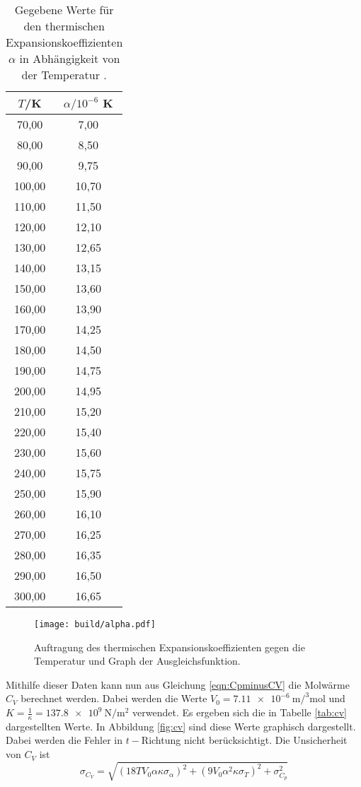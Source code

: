 \begin{table}[htp]
	\begin{center}
    \caption{Gegebene Werte für den thermischen Expansionskoeffizienten $\alpha$ in Abhängigkeit von der
    Temperatur \cite{versuchsanleitung}.}
    \label{tab:alpha}
		\begin{tabular}{cc}
		\toprule
			{$T$/K} & {$\alpha/10^{-6}$ K}\\
			\midrule
			70,00 & 7,00\\
			80,00 & 8,50\\
			90,00 & 9,75\\
			100,00 & 10,70\\
			110,00 & 11,50\\
			120,00 & 12,10\\
			130,00 & 12,65\\
			140,00 & 13,15\\
			150,00 & 13,60\\
			160,00 & 13,90\\
			170,00 & 14,25\\
			180,00 & 14,50\\
			190,00 & 14,75\\
			200,00 & 14,95\\
			210,00 & 15,20\\
			220,00 & 15,40\\
			230,00 & 15,60\\
			240,00 & 15,75\\
			250,00 & 15,90\\
			260,00 & 16,10\\
			270,00 & 16,25\\
			280,00 & 16,35\\
			290,00 & 16,50\\
			300,00 & 16,65\\
		\bottomrule
		\end{tabular}
	\end{center}
\end{table}

\begin{figure}
  \centering
  \texttt{[image: build/alpha.pdf]}
  \caption{Auftragung des thermischen Expansionskoeffizienten gegen die Temperatur und Graph der
  Ausgleichsfunktion.}
  \label{fig:alpha}
\end{figure}

Mithilfe dieser Daten kann nun aus Gleichung \eqref{eqn:CpminusCV} die Molwärme $C_V$
berechnet werden. Dabei werden die Werte $V_0=\SI{7.11e-6}{\metre\cubic\per\mole}$
\cite{molvolumen} und $K=\frac{1}{\kappa}=\SI{137.8e9}{\newton\per\metre\squared}$
\cite{kompressionsmodul} verwendet. Es ergeben sich die
in Tabelle \ref{tab:cv} dargestellten Werte. In Abbildung \ref{fig:cv} sind diese Werte
graphisch dargestellt. Dabei werden die Fehler in $t-$Richtung nicht berücksichtigt.
Die Unsicherheit von $C_V$ ist
\begin{equation*}
  \sigma_{C_V} = \sqrt{(18 T V_0 \alpha \kappa \sigma_\alpha)^2 + (9 V_0 \alpha^2 \kappa \sigma_T)^2 + \sigma_{C_{p}}^{2}}
\end{equation*}

